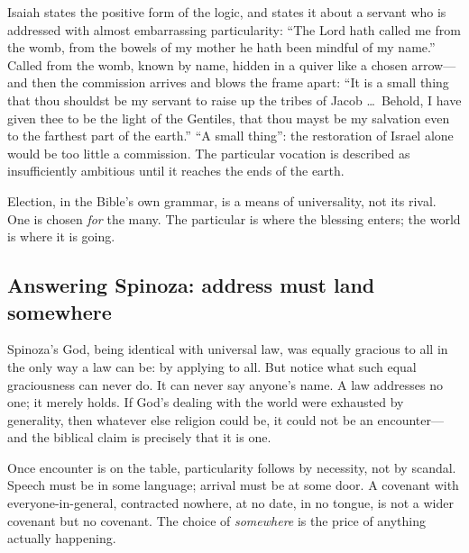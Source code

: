 Isaiah states the positive form of the logic, and states it about a servant who is addressed with almost embarrassing particularity: ``The Lord hath called me from the womb, from the bowels of my mother he hath been mindful of my name.'' Called from the womb, known by name, hidden in a quiver like a chosen arrow---and then the commission arrives and blows the frame apart: ``It is a small thing that thou shouldst be my servant to raise up the tribes of Jacob \ldots\ Behold, I have given thee to be the light of the Gentiles, that thou mayst be my salvation even to the farthest part of the earth.'' ``A small thing'': the restoration of Israel alone would be too little a commission. The particular vocation is described as insufficiently ambitious until it reaches the ends of the earth.

Election, in the Bible's own grammar, is a means of universality, not its rival. One is chosen \emph{for} the many. The particular is where the blessing enters; the world is where it is going.

\subsection{Answering Spinoza: address must land somewhere}

Spinoza's God, being identical with universal law, was equally gracious to all in the only way a law can be: by applying to all. But notice what such equal graciousness can never do. It can never say anyone's name. A law addresses no one; it merely holds. If God's dealing with the world were exhausted by generality, then whatever else religion could be, it could not be an encounter---and the biblical claim is precisely that it is one.

Once encounter is on the table, particularity follows by necessity, not by scandal. Speech must be in some language; arrival must be at some door. A covenant with everyone-in-general, contracted nowhere, at no date, in no tongue, is not a wider covenant but no covenant. The choice of \emph{somewhere} is the price of anything actually happening.

